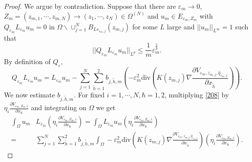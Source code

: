 \documentclass[10pt,a4paper]{amsart}
\begin{document}
\begin{proof}
We argue by contradiction. Suppose that there are $ \varepsilon_m \to 0 $, $ Z_m=(z_{m,1},\cdots,z_{m,N})\to (z_{1},\cdots,z_{N})\in \Omega^{(N)} $  and $  u_m \in E_{\varepsilon_m, Z_m} $ with $ Q_{\varepsilon_m} L_{\varepsilon_m} u_m = 0 $ in $ \Omega \backslash\cup_{j=1}^NB_{Ls_{\varepsilon_m,j}}(z_{m,j}) $ for some $ L $ large and $ ||u_m||_{L^\infty}=1 $ such that
\begin{equation*}
||Q_{\varepsilon_m} L_{\varepsilon_m} u_m||_{L^p}\leq \frac{1}{m}\varepsilon_m^{\frac{2}{p}}.
\end{equation*}
By definition of $ Q_{\varepsilon}  $,
\begin{equation}\label{208}
Q_{\varepsilon_m} L_{\varepsilon_m} u_m=  L_{\varepsilon_m} u_m-\sum_{j=1}^N\sum_{\tilde{h}=1}^2b_{j,\tilde{h},m}\left( -\varepsilon_m^2\text{div}\left (K(z_{m,j})\nabla   \frac{\partial V_{\varepsilon_m, z_{m,j},\hat{q}_{\varepsilon_m,j}}}{\partial x_{\tilde{h}}}\right )\right) .
\end{equation}
We now estimate $ b_{j,\tilde{h},m} $. For fixed $ i=1,\cdots,N, \hbar=1,2 $, multiplying \eqref{208} by $ \eta_i\frac{\partial V_{\varepsilon_m, Z_{m},i}}{\partial x_\hbar} $ and integrating on $ \Omega $ we get
\begin{equation*}
\begin{split}
\int_{\Omega}u_m&L_{\varepsilon_m}\left( \eta_i\frac{\partial V_{\varepsilon_m, Z_{m},i}}{\partial x_\hbar}\right) =\int_{\Omega}L_{\varepsilon_m}u_m\left( \eta_i\frac{\partial V_{\varepsilon_m, Z_{m},i}}{\partial x_\hbar}\right) \\
=&\sum_{j=1}^N\sum_{\tilde{h}=1}^2b_{j,\tilde{h},m}\int_{\Omega}-\varepsilon_m^2\text{div}\left (K(z_{m,j})\nabla   \frac{\partial V_{\varepsilon_m, z_{m,j},\hat{q}_{\varepsilon_m,j}}}{\partial x_{\tilde{h}}}\right )\left( \eta_i\frac{\partial V_{\varepsilon_m, Z_{m},i}}{\partial x_\hbar}\right) .
\end{split}
\end{equation*}


\end{proof}
\end{document}
